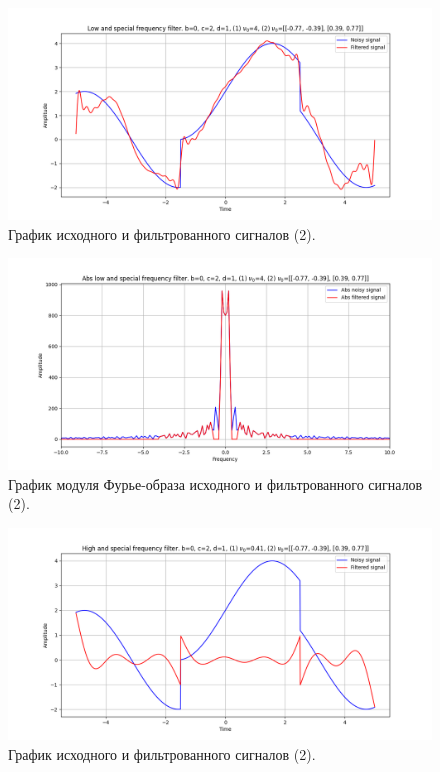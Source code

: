 \documentclass[a4paper, 12pt]{article}
\begin{document}
    \begin{figure}[!htb]
        \centering
        \includegraphics[scale=0.48]{2_3_u_flt_u_nospec.png}
        \captionsetup{skip=0pt}
        \caption{График исходного и фильтрованного сигналов (2).}
        \label{fig:fig87}
    \end{figure}
    \begin{figure}[!htb]
        \centering
        \includegraphics[scale=0.48]{2_3_abs_u_U_nospec.png}
        \captionsetup{skip=0pt}
        \caption{График модуля Фурье-образа исходного и фильтрованного сигналов (2).}
        \label{fig:fig88}
    \end{figure}
    \begin{figure}[!htb]
        \centering
        \includegraphics[scale=0.48]{2_4_u_flt_u_nospec.png}
        \captionsetup{skip=0pt}
        \caption{График исходного и фильтрованного сигналов (2).}
        \label{fig:fig89}
    \end{figure}
\end{document}
